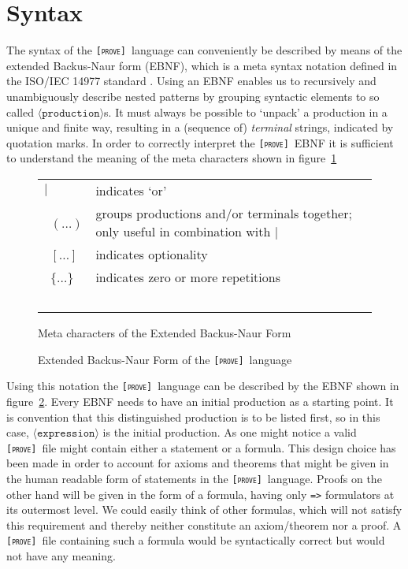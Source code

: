 \documentclass[british]{article}
\newcommand\prv{bc}
\newcommand\m[1]{\texttt{#1}}
\newcommand\name{\texttt{\textsc{[prove]}}}
\providecommand{\tabularnewline}{\\}
\begin{document}
\section{Syntax}

The syntax of the \name\ language can conveniently be described by means of the
extended Backus-Naur form (EBNF), which is a meta syntax notation defined in the
ISO/IEC 14977 standard \parencite{ISO}. Using an EBNF enables us to recursively
and unambiguously describe nested patterns by grouping syntactic elements to so
called $\langle\texttt{production}\rangle$s.  It must always be possible to
`unpack' a production in a unique and finite way, resulting in a (sequence of)
\textit{terminal} strings, indicated by quotation marks. In order to correctly
interpret the \name\ EBNF it is sufficient to understand the meaning of the meta
characters shown in figure~\ref{fig:meta}

\bigskip{}

\begin{figure}[!ht]
\centering
\begin{doublespace}
\begin{tabular}{l|l}
$|$ & indicates `or'\tabularnewline\
$(\dots)$ & groups productions and/or terminals together; only useful in
combination with $|$\tabularnewline\
$[\dots]$ & indicates optionality\tabularnewline\
$\{\dots\}$ & indicates zero or more repetitions\tabularnewline\
\end{tabular}%
\caption{Meta characters of the Extended Backus-Naur Form}\label{fig:meta}
\end{doublespace}
\end{figure}

\begin{figure}[!ht]
\centering
\textcolor{dartmouthgreen}{}
\caption{Extended Backus-Naur Form of the \name\ language}\label{fig:ebnf}
\end{figure}

\medskip{}

Using this notation the \name\ language can be described by the EBNF shown in
figure~\ref{fig:ebnf}.  Every EBNF needs to have an initial production as a
starting point.  It is convention that this distinguished production is to be
listed first, so in this case, $\langle\texttt{expression}\rangle$ is the initial
production. As one might notice a valid \name\ file might contain either a
statement or a formula. This design choice has been made in order to account for
axioms and theorems that might be given in the human readable form of statements
in the \name\ language.  Proofs on the other hand will be given in the form of a
formula, having only \m{=>} formulators at its outermost level. We could easily
think of other formulas, which will not satisfy this requirement and thereby
neither constitute an axiom/theorem nor a proof. A \name\ file containing such a
formula would be syntactically correct but would not have any meaning.
\end{document}
